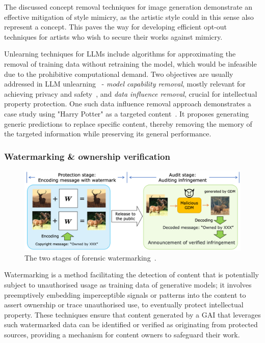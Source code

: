 \documentclass[conference,table]{IEEEtran}
\begin{document}
The discussed concept removal techniques for image generation demonstrate an effective mitigation of style mimicry, as the artistic style could in this sense also represent a concept. 
This paves the way for developing efficient opt-out techniques for artists who wish to secure their works against mimicry. 

Unlearning techniques for LLMs include algorithms for approximating the removal of training data without retraining the model, which would be infeasible due to the prohibitive computational demand. 
Two objectives are usually addressed in LLM unlearning~\cite{liu_rethinking_2024} - \textit{model capability removal}, mostly relevant for achieving privacy and safety~\cite{jang_knowledge_2022,wu_depn_2023,lu_quark_2022}, and \textit{data influence removal}, crucial for intellectual property protection.
One such data influence removal approach demonstrates a case study using "Harry Potter" as a targeted content~\cite{eldan_whos_2023}. 
It proposes generating generic predictions to replace specific content, thereby removing the memory of the targeted information while preserving its general performance. 

\subsubsection{Watermarking \& ownership verification} \label{sec:mitigation-watermarking}
\begin{figure}
    \centering
    \includegraphics[width=\linewidth]{watermarking-stages.PNG}
    \caption{The two stages of forensic watermarking~\cite{cui_diffusionshield_2023}.}
    \label{fig:watermarking-stages}
\end{figure}
Watermarking is a method facilitating the detection of content that is potentially subject to unauthorised usage as training data of generative models; it involves preemptively embedding imperceptible signals or patterns into the content to assert ownership or trace unauthorised use, to eventually protect intellectual property. 
These techniques ensure that content generated by a GAI that leverages such watermarked data can be identified or verified as originating from protected sources, providing a mechanism for content owners to safeguard their work. 
\end{document}

